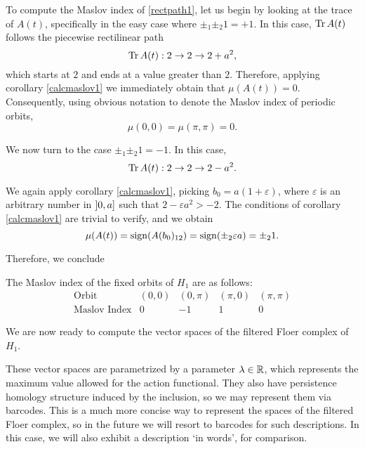 To compute the Maslov index of \eqref{rectpath1}, let us begin by looking at the trace of $A(t)$, specifically in the easy case where $\pm_1 \pm_2 1 = +1$. In this case, $\operatorname{Tr} A(t)$ follows the piecewise rectilinear path
\begin{equation}
\operatorname{Tr} A(t) : 2 \to 2 \to 2 + a^2,
\end{equation}
which starts at $2$ and ends at a value greater than $2$. Therefore, applying corollary \ref{calcmaslov1} we immediately obtain that $\mu(A(t)) = 0$. Consequently, using obvious notation to denote the Maslov index of periodic orbits,
\begin{equation}
\mu(0,0) = \mu(\pi,\pi) = 0.
\end{equation}

We now turn to the case $\pm_1 \pm_2 1 = -1$. In this case,
\begin{equation}
\operatorname{Tr} A(t) : 2 \to 2 \to 2 - a^2.
\end{equation}

We again apply corollary \ref{calcmaslov1}, picking $b_0 = a(1 + \varepsilon)$, where $\varepsilon$ is an arbitrary number in $\linterval 0 a$ such that $2 - \varepsilon a^2 > -2$. The conditions of corollary \ref{calcmaslov1} are trivial to verify, and we obtain
\begin{equation}
\mu(A(t)) = \operatorname{sign}(A(b_0)_{12}) = \operatorname{sign}(\pm_2 \varepsilon a) = \pm_2 1.
\end{equation}

Therefore, we conclude
\begin{prop}
The Maslov index of the fixed orbits of $H_1$ are as follows:
\begin{equation}
\begin{array}{c|c|c|c|c}
\text{Orbit} & (0,0) & (0,\pi) & (\pi,0) & (\pi,\pi)\\
\hline
\text{Maslov Index} & 0 & -1 & 1 & 0
\end{array}
\end{equation}
\end{prop}

We are now ready to compute the vector spaces of the filtered Floer complex of $H_1$.

These vector spaces are parametrized by a parameter $\lambda \in \mathbb{R}$, which represents the maximum value allowed for the action functional. They also have persistence homology structure induced by the inclusion, so we may represent them via barcodes. This is a much more concise way to represent the spaces of the filtered Floer complex, so in the future we will resort to barcodes for such descriptions. In this case, we will also exhibit a description `in words', for comparison.

